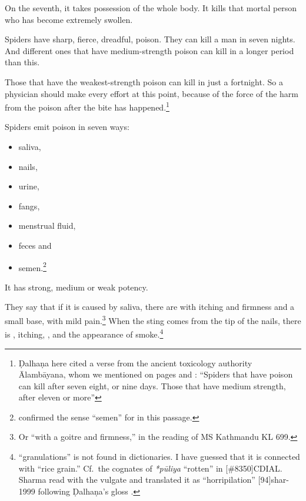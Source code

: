 \begin{translation}
On the seventh, it takes possession of the whole body. It kills that mortal person 
who has become extremely swollen. 
    
\item[83]

Spiders have sharp, fierce, dreadful,   poison.  They can kill a man in seven 
nights.
And different ones that have medium-strength poison can kill in a longer period 
than this. 
    
\item[84]

Those that have the weakest-strength poison can kill in just a
fortnight.  So a physician should make every effort at this point,
because of the force of the harm from the poison after the bite has
happened.\footnote{Ḍalhaṇa here cited a verse from the ancient
    toxicology authority Ālambāyana, whom we mentioned on pages
    \pageref{alambayana1} and \pageref{alambayana2} \citep[591]{vulgate}:
     “Spiders that have  poison can
    kill after seven eight, or nine days.  Those that have medium
    strength, after eleven or more”}

\item[85]

Spiders emit poison in seven ways:
\begin{itemize}
    \item saliva,
    \item nails,
    \item urine,
    \item fangs,
    \item menstrual fluid,
    \item feces
    and 
    \item semen.\footnote{ confirmed the sense “semen” 
    for  in this passage.}
\end{itemize}
It has strong, medium or weak potency.

\item[86]

They say that if it is caused by saliva, there are 
with itching and firmness and a small base, with mild
pain.\footnote{Or “with a goitre and firmness,” in the reading of MS
    Kathmandu KL 699.}  When the sting comes from the tip of the nails,
    there is , itching, ,
    and the appearance of smoke.\footnote{ “granulations” is
        not found in dictionaries. I have guessed that it is connected with
         “rice grain.” Cf.\ the cognates of \emph{*pūliya}
        “rotten” in [\#8350]{CDIAL}. Sharma read 
        with the vulgate and translated it as “horripilation”
        [94]{shar-1999} following Ḍalhaṇa's gloss 
        \cite[592]{vulgate}.}
        

\end{translation}
